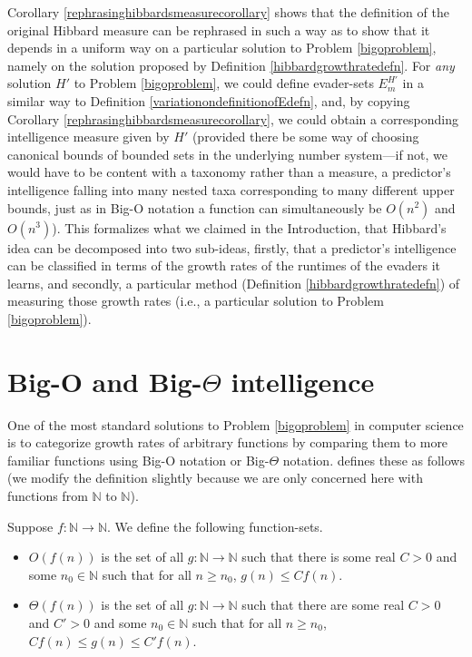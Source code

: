 \documentclass[twoside,11pt]{article}
\begin{document}
\begin{remark}
\label{epiphanyremark}
Corollary \ref{rephrasinghibbardsmeasurecorollary} shows that
the definition of the original Hibbard measure can be rephrased in such a way
as to show that it depends in a uniform way on a particular solution to
Problem \ref{bigoproblem}, namely on the solution proposed by
Definition \ref{hibbardgrowthratedefn}. For \emph{any} solution $H'$ to
Problem \ref{bigoproblem}, we could define evader-sets $E^{H'}_m$ in a similar
way to Definition \ref{variationondefinitionofEdefn}, and, by copying
Corollary \ref{rephrasinghibbardsmeasurecorollary}, we could obtain a corresponding
intelligence measure given by $H'$
(provided there be some way of choosing canonical bounds of bounded sets in the
underlying number system---if not, we would have to be content with a taxonomy
rather than a measure, a predictor's intelligence falling into many nested
taxa corresponding to many different upper bounds, just as in Big-O notation a
function can simultaneously be $O(n^2)$ and $O(n^3)$).
This formalizes what we claimed in the Introduction,
that Hibbard's idea can be decomposed into two sub-ideas, firstly, that a predictor's
intelligence can be classified in terms of the growth rates of the runtimes of the
evaders it learns, and secondly, a particular method
(Definition \ref{hibbardgrowthratedefn})
of measuring those growth rates (i.e., a particular solution to
Problem \ref{bigoproblem}).
\end{remark}


\section{Big-O and Big-$\Theta$ intelligence}
\label{bigosection}

One of the most standard solutions
to Problem \ref{bigoproblem} in computer science is to categorize
growth rates of arbitrary functions by comparing them to more familiar functions using
Big-O notation or Big-$\Theta$ notation.
\citet{knuth1976big} defines these as follows
(we modify the definition slightly because
we are only concerned here with functions from $\mathbb N$ to $\mathbb N$).

\begin{definition}
\label{bigodefn}
    Suppose $f:\mathbb N\to\mathbb N$. We define the following function-sets.
    \begin{itemize}
        \item
        $O(f(n))$ is the set of all $g:\mathbb N\to\mathbb N$ such that
        there is some real $C>0$ and some $n_0\in\mathbb N$ such that
        for all $n\geq n_0$, $g(n)\leq Cf(n)$.
        \item
        $\Theta(f(n))$ is the set of all $g:\mathbb N\to\mathbb N$ such that
        there are some real $C>0$ and $C'>0$ and some $n_0\in\mathbb N$ such that
        for all $n\geq n_0$, $Cf(n)\leq g(n)\leq C'f(n)$.
    \end{itemize}
\end{definition}
\end{document}
